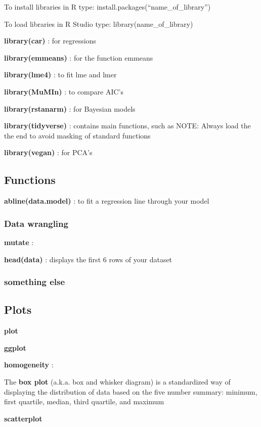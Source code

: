 \documentclass[]{article}
\begin{document}
To install libraries in R type: install.packages(``name\_of\_library'')

To load libraries in R Studio type: library(name\_of\_library)

\textbf{library(car)} : for regressions

\textbf{library(emmeans)} : for the function emmeans

\textbf{library(lme4)} : to fit lme and lmer

\textbf{library(MuMIn)} : to compare AIC's

\textbf{library(rstanarm)} : for Bayesian models

\textbf{library(tidyverse)} : contains main functions, such as NOTE:
Always load the the end to avoid masking of standard functions

\textbf{library(vegan)} : for PCA's

\subsection{Functions}\label{functions}

\textbf{abline(data.model)} : to fit a regression line through your
model

\subsubsection{Data wrangling}\label{data-wrangling}

\textbf{mutate} :

\textbf{head(data)} : displays the first 6 rows of your dataset

\subsubsection{something else}\label{something-else}

\subsection{Plots}\label{plots}

\textbf{plot}

\textbf{ggplot}

\textbf{homogeneity} :

The \textbf{box plot} (a.k.a. box and whisker diagram) is a standardized
way of displaying the distribution of data based on the five number
summary: minimum, first quartile, median, third quartile, and maximum

\textbf{scatterplot}
\end{document}

